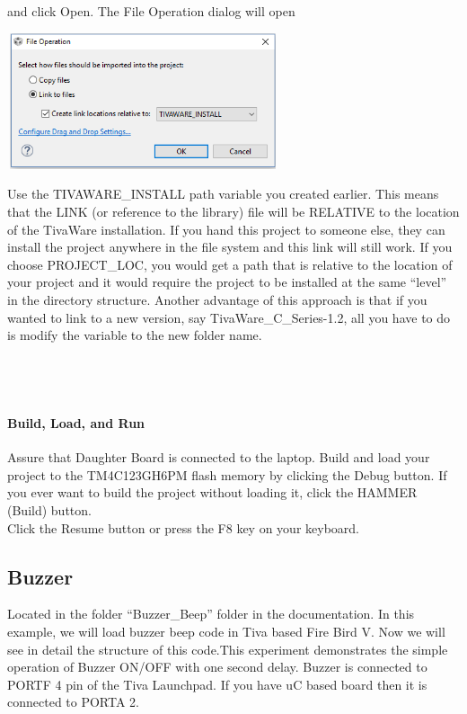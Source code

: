 \documentclass[a4paper,10pt,oneside]{article}
\begin{document}
					and click Open. The File Operation dialog will open \\
					\begin{center}
						\includegraphics[width=8cm, height=4cm]{driverlib}
					\end{center}
					Use the TIVAWARE\_INSTALL path variable you created earlier. This means that the LINK
					(or reference to the library) file will be RELATIVE to the location of the TivaWare
					installation. If you hand this project to someone else, they can install the project anywhere in
					the file system and this link will still work. If you choose PROJECT\_LOC, you would get a
					path that is relative to the location of your project and it would require the project to be
					installed at the same “level” in the directory structure. Another advantage of this approach is 
					that if you wanted to link to a new version, say TivaWare\_C\_Series-1.2, all you have
					to do is modify the variable to the new folder name.\\ 
					\\
					\\
					\\
					
					\paragraph{\Large \textbf{Build, Load, and Run }}
					Assure that Daughter Board is connected to the laptop. Build and load your project to the TM4C123GH6PM flash memory by clicking the Debug button. If you ever want to build the project without loading it, click the HAMMER (Build) button. \\
					Click the Resume button or press the F8 key on your keyboard.
					
		\subsection{\huge \textbf{Buzzer}}
		
			Located in the folder “Buzzer\_Beep” folder in the documentation.
			In this example, we will load buzzer beep code in Tiva based Fire Bird V. Now we will see in detail the structure of this code.This experiment demonstrates the simple operation of Buzzer ON/OFF with one second delay.
			Buzzer is connected to PORTF 4 pin of the Tiva Launchpad. If you have uC based board then it is connected to PORTA 2.
		
\end{document}
